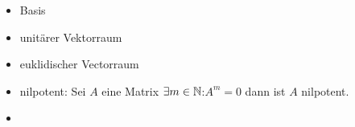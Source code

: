 \begin{itemize}
    \item Basis
    \item unitärer Vektorraum
    \item euklidischer Vectorraum
    \item nilpotent: Sei $A$ eine Matrix $\exists m\in \mathbb{N}$\quad :\quad $A^m=0$ dann ist $A$ nilpotent.
    
    \item 
\end{itemize}
